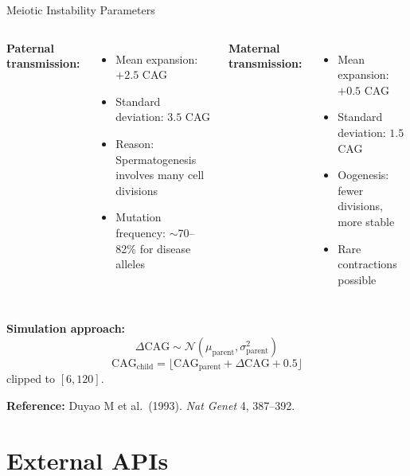\documentclass[aspectratio=169,11pt]{beamer}
\begin{document}
\begin{frame}{Meiotic Instability Parameters}
    \begin{columns}[T]
        \textbf{Paternal transmission:}
        \begin{itemize}
            \item Mean expansion: $+2.5$ CAG
            \item Standard deviation: $3.5$ CAG
            \item Reason: Spermatogenesis involves many cell divisions
            \item Mutation frequency: $\sim$70--82\% for disease alleles
        \end{itemize}

        \textbf{Maternal transmission:}
        \begin{itemize}
            \item Mean expansion: $+0.5$ CAG
            \item Standard deviation: $1.5$ CAG
            \item Oogenesis: fewer divisions, more stable
            \item Rare contractions possible
        \end{itemize}
    \end{columns}

    \textbf{Simulation approach:}
    \[
    \Delta\text{CAG} \sim \mathcal{N}(\mu_{\text{parent}}, \sigma_{\text{parent}}^2)
    \]
    \[
    \text{CAG}_{\text{child}} = \bigl\lfloor \text{CAG}_{\text{parent}} + \Delta\text{CAG} + 0.5 \bigr\rfloor
    \]
    clipped to $[6, 120]$.

    \textbf{Reference:} Duyao M et al.\ (1993). \textit{Nat Genet} 4, 387--392.
\end{frame}

\section{External APIs}
\end{document}
